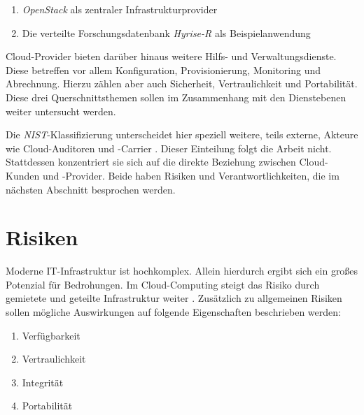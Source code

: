\begin{enumerate}
	\item \emph{OpenStack} als zentraler Infrastrukturprovider
	\item Die verteilte Forschungsdatenbank \emph{Hyrise-R} als Beispielanwendung
\end{enumerate}

\noindent
Cloud-Provider bieten darüber hinaus weitere Hilfs- und Verwaltungsdienste. Diese betreffen vor allem Konfiguration, Provisionierung, Monitoring und Abrechnung. Hierzu zählen aber auch Sicherheit, Vertraulichkeit und Portabilität. Diese drei Querschnittsthemen sollen im Zusammenhang mit den Dienstebenen weiter untersucht werden.

Die \emph{NIST}-Klassifizierung unterscheidet hier speziell weitere, teils externe, Akteure wie Cloud-Auditoren und -Carrier \cite{nist:2011:reference-architecture}. Dieser Einteilung folgt die Arbeit nicht. Stattdessen konzentriert sie sich auf die direkte Beziehung zwischen Cloud-Kunden und -Provider. Beide haben Risiken und Verantwortlichkeiten, die im nächsten Abschnitt besprochen werden.

\section{Risiken}


Moderne IT-Infrastruktur ist hochkomplex. Allein hierdurch ergibt sich ein großes Potenzial für Bedrohungen. Im Cloud-Computing steigt das Risiko durch gemietete und geteilte Infrastruktur weiter \cite{csa:2016:cloud-top-threats, Pearson:2010:issues-arising-cloud, 2011:takabi:security-challenges}. Zusätzlich zu allgemeinen Risiken sollen mögliche Auswirkungen auf folgende Eigenschaften beschrieben werden:

\begin{enumerate}
	\item Verfügbarkeit
	\item Vertraulichkeit
	\item Integrität
	\item Portabilität
\end{enumerate}

